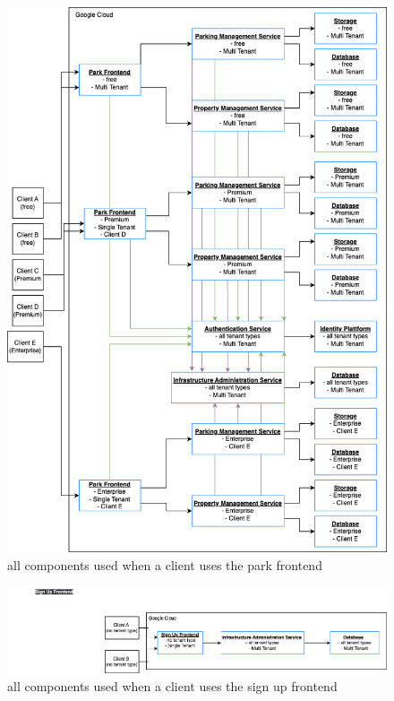 \begin{figure}[ht]
  \centering
  \includegraphics[width=\textwidth]{resources/03-runtime-view/components-park-frontend.png}
  \caption{all components used when a client uses the park frontend}
  \label{fig:03-components-park-frontend}
\end{figure}

\begin{figure}[ht]
  \centering
  \includegraphics[width=\textwidth]{resources/03-runtime-view/components-signup-frontend.png}
  \caption{all components used when a client uses the sign up frontend}
  \label{fig:03-components-signup-frontend}
\end{figure}

